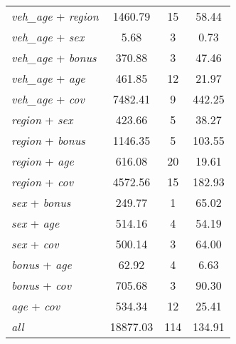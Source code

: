 {\begin{ThreePartTable}
\begin{longtable}{lccc}
    \textit{veh\_age} + \textit{region} &  1460.79 &       15 &    58.44 \\
    \textit{veh\_age} + \textit{sex} &     5.68 &        3 &     0.73 \\
    \textit{veh\_age} + \textit{bonus} &   370.88 &        3 &    47.46 \\
    \textit{veh\_age} + \textit{age} &   461.85 &       12 &    21.97 \\
    \textit{veh\_age} + \textit{cov} &  7482.41 &        9 &   442.25 \\
    \textit{region} + \textit{sex} &   423.66 &        5 &    38.27 \\
    \textit{region} + \textit{bonus} &  1146.35 &        5 &   103.55 \\
    \textit{region} + \textit{age} &   616.08 &       20 &    19.61 \\
    \textit{region} + \textit{cov} &  4572.56 &       15 &   182.93 \\
    \textit{sex} + \textit{bonus} &   249.77 &        1 &    65.02 \\
    \textit{sex} + \textit{age} &   514.16 &        4 &    54.19 \\
    \textit{sex} + \textit{cov} &   500.14 &        3 &    64.00 \\
    \textit{bonus} + \textit{age} &    62.92 &        4 &     6.63 \\
    \textit{bonus} + \textit{cov} &   705.68 &        3 &    90.30 \\
    \textit{age} + \textit{cov} &   534.34 &       12 &    25.41 \\
    \textit{all}\tnote{\ddag} & 18877.03 &      114 &   134.91 \\

\end{longtable}
\end{ThreePartTable}
}
